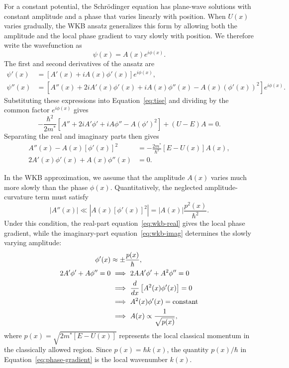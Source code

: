\documentclass[12pt]{article}
\begin{document}
For a constant potential, the Schr\"odinger equation has plane-wave solutions with constant amplitude and a phase that varies linearly with position. When \(U(x)\) varies gradually, the WKB ansatz generalizes this form by allowing both the amplitude and the local phase gradient to vary slowly with position. We therefore write the wavefunction as
\begin{equation}
    \psi(x)=A(x)e^{i\phi(x)}.
    \label{eq:wkb-ansatz}
\end{equation}
The first and second derivatives of the ansatz are
\begin{align*}
    \psi'(x)
    &=\left[A'(x)+iA(x)\phi'(x)\right]e^{i\phi(x)},\\
    \psi''(x)
    &=\left[A''(x)+2iA'(x)\phi'(x)
    +iA(x)\phi''(x)-A(x)\left(\phi'(x)\right)^2\right]e^{i\phi(x)}.
\end{align*}
Substituting these expressions into Equation~\eqref{eq:tise} and dividing by the common factor \(e^{i\phi(x)}\) gives
\begin{equation*}
    -\frac{\hbar^2}{2m^*}
    \left[A''+2iA'\phi'+iA\phi''-A(\phi')^2\right]
    +(U-E)A=0.
\end{equation*}
Separating the real and imaginary parts then gives
\begin{align}
    A''(x)-A(x)\left[\phi'(x)\right]^2
    &=-\frac{2m^*}{\hbar^2}[E-U(x)]A(x),
    \label{eq:wkb-real}\\
    2A'(x)\phi'(x)+A(x)\phi''(x)
    &=0.
    \label{eq:wkb-imag}
\end{align}

In the WKB approximation, we assume that the amplitude \(A(x)\) varies much more slowly than the phase \(\phi(x)\). Quantitatively, the neglected amplitude-curvature term must satisfy
\[
    \left|A''(x)\right|
    \ll
    \left|A(x)\left[\phi'(x)\right]^2\right|
    =\left|A(x)\right|\frac{p^2(x)}{\hbar^2}.
\]
Under this condition, the real-part equation~\eqref{eq:wkb-real} gives the local phase gradient, while the imaginary-part equation~\eqref{eq:wkb-imag} determines the slowly varying amplitude:
\begin{align}
    \phi'(x)&\approx\pm\frac{p(x)}{\hbar},
    \label{eq:phase-gradient}\\
    2A'\phi'+A\phi''=0
    &\ \Longrightarrow\ 2AA'\phi'+A^2\phi''=0
    \notag\\
    &\ \Longrightarrow\
    \frac{d}{dx}\left[A^2(x)\phi'(x)\right]=0
    \notag\\
    &\ \Longrightarrow\ A^2(x)\phi'(x)=\text{constant}
    \notag\\
    &\ \Longrightarrow\
    A(x)\propto\frac{1}{\sqrt{p(x)}},
    \label{eq:wkb-amplitude}
\end{align}
where \(p(x)=\sqrt{2m^*[E-U(x)]}\) represents the local classical momentum in the classically allowed region. Since \(p(x)=\hbar k(x)\), the quantity \(p(x)/\hbar\) in Equation~\eqref{eq:phase-gradient} is the local wavenumber \(k(x)\).
\end{document}
